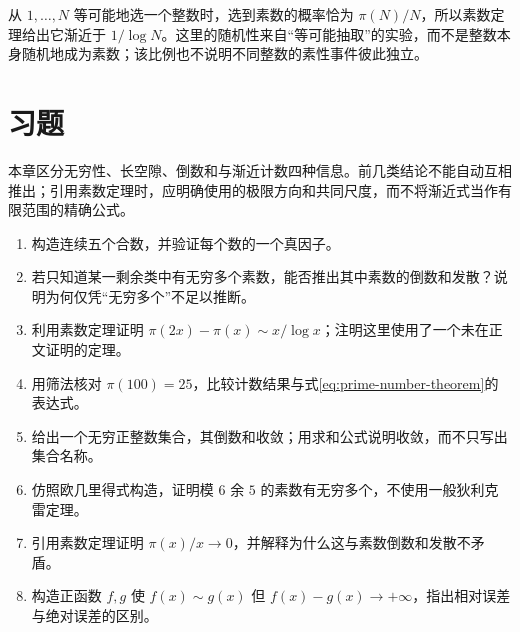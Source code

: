从 $1,\ldots,N$ 等可能地选一个整数时，选到素数的概率恰为 $\pi(N)/N$，所以素数定理给出它渐近于 $1/\log N$。这里的随机性来自“等可能抽取”的实验，而不是整数本身随机地成为素数；该比例也不说明不同整数的素性事件彼此独立。

\section{习题}

本章区分无穷性、长空隙、倒数和与渐近计数四种信息。前几类结论不能自动互相推出；引用素数定理时，应明确使用的极限方向和共同尺度，而不将渐近式当作有限范围的精确公式。

\begin{enumerate}
 \item 构造连续五个合数，并验证每个数的一个真因子。
 \item 若只知道某一剩余类中有无穷多个素数，能否推出其中素数的倒数和发散？说明为何仅凭“无穷多个”不足以推断。
 \item 利用素数定理证明 $\pi(2x)-\pi(x)\sim x/\log x$；注明这里使用了一个未在正文证明的定理。
 \item 用筛法核对 $\pi(100)=25$，比较计数结果与式\eqref{eq:prime-number-theorem}的表达式。
 \item\label{ex:distribution-sparse} 给出一个无穷正整数集合，其倒数和收敛；用求和公式说明收敛，而不只写出集合名称。
 \item\label{ex:distribution-six-five} 仿照欧几里得式构造，证明模 $6$ 余 $5$ 的素数有无穷多个，不使用一般狄利克雷定理。
 \item\label{ex:distribution-density} 引用素数定理证明 $\pi(x)/x\to0$，并解释为什么这与素数倒数和发散不矛盾。
 \item\label{ex:distribution-asymptotic} 构造正函数 $f,g$ 使 $f(x)\sim g(x)$ 但 $f(x)-g(x)\to+\infty$，指出相对误差与绝对误差的区别。
\end{enumerate}

